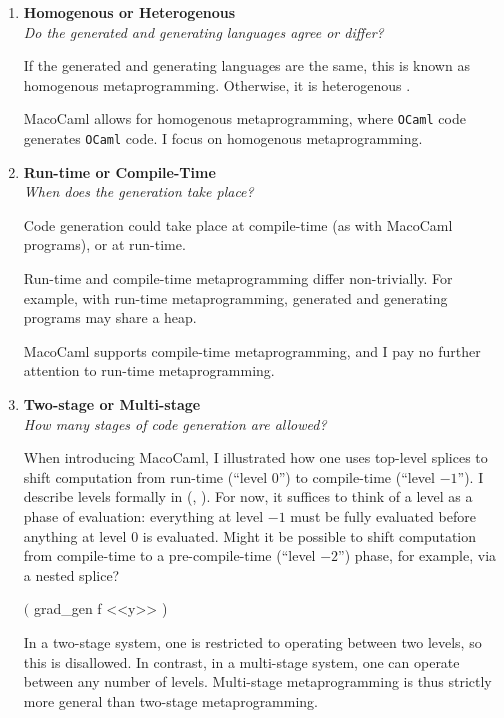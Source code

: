 \begin{enumerate}
  \item \textbf{\textsf{Homogenous or Heterogenous}}\\
         \textit{Do the generated and generating languages agree or differ?}
  
        If the generated and generating languages are the same, this is known as {homogenous} metaprogramming. Otherwise, it is {heterogenous} \citep{kiselyov-2024}.

        MacoCaml allows for homogenous metaprogramming, where \texttt{OCaml} code generates \texttt{OCaml} code. I focus on homogenous metaprogramming.

  \item \textbf{\textsf{Run-time or Compile-Time}} \\
        \textit{When does the generation take place?}

        Code generation could take place at compile-time (as with MacoCaml programs), or at run-time.

        
        Run-time and compile-time metaprogramming differ non-trivially. For example, with run-time metaprogramming, generated and generating programs may share a heap. 

        MacoCaml supports compile-time metaprogramming, and I pay no further attention to run-time metaprogramming.
        
  \item \textbf{\textsf{Two-stage or Multi-stage}} \\
  \textit{How many stages of code generation are allowed?}

  When introducing MacoCaml, I illustrated how one uses top-level splices to shift computation from run-time (``level $0$'') to compile-time (``level $-1$''). I describe levels formally in  (, ). For now, it suffices to think of a level as a phase of evaluation: everything at level $-1$ must be fully evaluated before anything at level $0$ is evaluated. Might it be possible to shift computation from compile-time to a pre-compile-time (``level $-2$'') phase, for example, via a nested splice?
  \begin{macocaml}
$($ grad_gen f <<y>> )
  \end{macocaml}
  In a two-stage system, one is restricted to operating between two levels, so this is disallowed. In contrast, in a multi-stage system, one can operate between any number of levels. Multi-stage metaprogramming is thus strictly more general than two-stage metaprogramming.
  

\end{enumerate}
